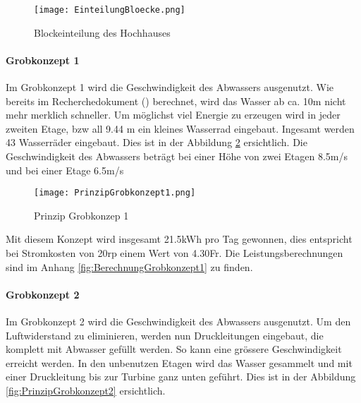 \bigskip

\begin{figure} [H]
	\centering
	\texttt{[image: EinteilungBloecke.png]}
	\caption{Blockeinteilung des Hochhauses}
	\label{fig:EinteilungBloecke}
\end{figure}

\newpage

\paragraph{Grobkonzept 1} 

Im Grobkonzept 1 wird die Geschwindigkeit des Abwassers ausgenutzt. Wie bereits im Recherchedokument (\cite{recherchedokument}) berechnet, wird das Wasser ab ca. 10m nicht mehr merklich schneller. Um möglichst viel Energie zu erzeugen wird in jeder zweiten Etage, bzw all 9.44 \si{m} ein kleines Wasserrad eingebaut. Ingesamt werden 43 Wasserräder eingebaut. Dies ist in der Abbildung \ref{fig:PrinzipGrobkonzept1}  ersichtlich. Die Geschwindigkeit des Abwassers beträgt bei einer Höhe von zwei Etagen 8.5\si{m/s} und bei einer Etage 6.5\si{m/s}

\begin{figure} [H]
	\centering
	\texttt{[image: PrinzipGrobkonzept1.png]}
	\caption{Prinzip Grobkonzep 1}
	\label{fig:PrinzipGrobkonzept1}
\end{figure}

Mit diesem Konzept wird insgesamt 21.5\si{kWh} pro Tag gewonnen, dies entspricht bei Stromkosten von 20\si{rp} einem Wert von 4.30\si{Fr}. Die Leistungsberechnungen sind im Anhang \ref{fig:BerechnungGrobkonzept1}  zu finden.

\newpage

\paragraph{Grobkonzept 2}

Im Grobkonzept 2 wird die Geschwindigkeit des Abwassers ausgenutzt. Um den Luftwiderstand zu eliminieren, werden nun Druckleitungen eingebaut, die komplett mit Abwasser gefüllt werden. So kann eine grössere Geschwindigkeit erreicht werden. In den unbenutzen Etagen wird das Wasser gesammelt und mit einer Druckleitung bis zur Turbine ganz unten geführt. Dies ist in der Abbildung \ref{fig:PrinzipGrobkonzept2}  ersichtlich.

